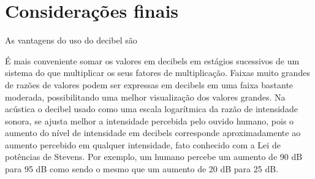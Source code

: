 \section{Considerações finais}
    As vantagens do uso do decibel são

    É mais conveniente somar os valores em decibels em estágios sucessivos de um sistema do que multiplicar os seus fatores de multiplicação.
    Faixas muito grandes de razões de valores podem ser expressas em decibels em uma faixa bastante moderada, possibilitando uma melhor visualização dos valores grandes.
    Na acústica o decibel usado como uma escala logarítmica da razão de intensidade sonora, se ajusta melhor a intensidade percebida pelo ouvido humano, pois o aumento do nível de intensidade em decibels corresponde aproximadamente ao aumento percebido em qualquer intensidade, fato conhecido com a Lei de potências de Stevens. Por exemplo, um humano percebe um aumento de 90 dB para 95 dB como sendo o mesmo que um aumento de 20 dB para 25 dB.
